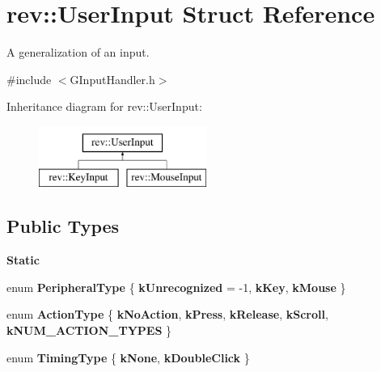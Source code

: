 \hypertarget{structrev_1_1_user_input}{}\section{rev\+::User\+Input Struct Reference}
\label{structrev_1_1_user_input}


A generalization of an input.  




{\ttfamily \#include $<$G\+Input\+Handler.\+h$>$}

Inheritance diagram for rev\+::User\+Input\+:\begin{figure}[H]
\begin{center}
\leavevmode
\includegraphics[height=2.000000cm]{structrev_1_1_user_input}
\end{center}
\end{figure}
\subsection*{Public Types}
\begin{Indent}\textbf{ Static}\par
\begin{DoxyCompactItemize}
\item 
\mbox{\label{structrev_1_1_user_input_a8e823eff6b7cb8b97b6e54d415ae67e3}} 
enum {\bfseries Peripheral\+Type} \{ {\bfseries k\+Unrecognized} = -\/1, 
{\bfseries k\+Key}, 
{\bfseries k\+Mouse}
 \}
\item 
\mbox{\label{structrev_1_1_user_input_ad273209d007485ca9177e68df6424c22}} 
enum {\bfseries Action\+Type} \{ \newline
{\bfseries k\+No\+Action}, 
{\bfseries k\+Press}, 
{\bfseries k\+Release}, 
{\bfseries k\+Scroll}, 
\newline
{\bfseries k\+N\+U\+M\+\_\+\+A\+C\+T\+I\+O\+N\+\_\+\+T\+Y\+P\+ES}
 \}
\item 
\mbox{\label{structrev_1_1_user_input_ab0dd92d79a3d6584ebfbcbf9312ee4ab}} 
enum {\bfseries Timing\+Type} \{ {\bfseries k\+None}, 
{\bfseries k\+Double\+Click}
 \}
\end{DoxyCompactItemize}
\end{Indent}
